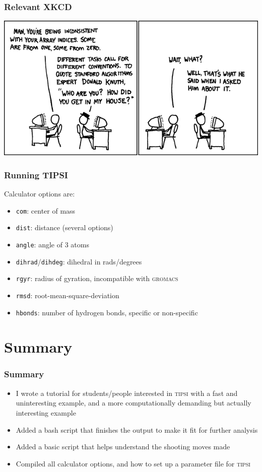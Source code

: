 \documentclass[hyperref={pdfpagelabels=false}]{beamer}
\begin{document}
\begin{frame}
\frametitle{Relevant XKCD}
\begin{center}
\includegraphics[scale=4]{images/donald_knuth.png}
\end{center}
\end{frame}

\begin{frame}
\frametitle{Running \textsc{TIPSI}} 
Calculator options are:
\begin{itemize}
\item \texttt{com}: center of mass
\item \texttt{dist}: distance (several options)
\item \texttt{angle}: angle of 3 atoms
\item \texttt{dihrad}/\texttt{dihdeg}: dihedral in rads/degrees
\item \texttt{rgyr}: radius of gyration, incompatible with \textsc{gromacs}
\item \texttt{rmsd}: root-mean-square-deviation
\item \texttt{hbonds}: number of hydrogen bonds, specific or non-specific
\end{itemize}
\end{frame}

\section{Summary}
\setcounter{subsection}{1}

\begin{frame}
\frametitle{Summary} 
\begin{itemize}
\item I wrote a tutorial for students/people interested in \textsc{tipsi} with a fast and uninteresting example, and a more computationally demanding but actually interesting example
\item Added a bash script that finishes the output to make it fit for further analysis
\item Added a basic script that helps understand the shooting moves made
\item Compiled all calculator options, and how to set up a parameter file for \textsc{tipsi}
\end{itemize}
\end{frame}
\end{document}
